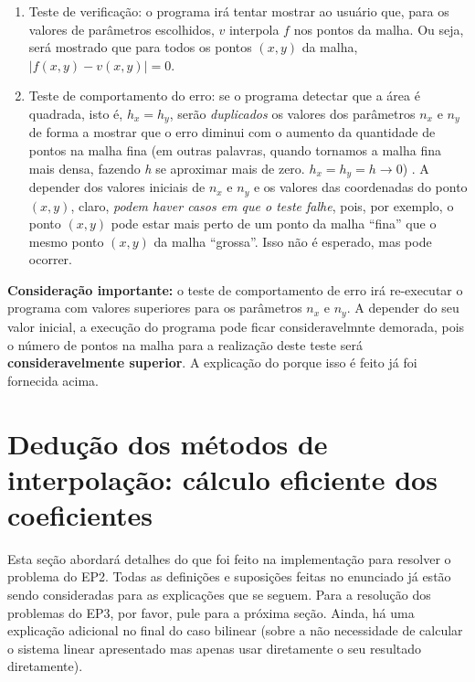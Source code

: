 \documentclass[11pt]{article}
\begin{document}
\begin{enumerate}
  \item Teste de verificação: o programa irá tentar mostrar ao usuário que, para os valores de parâmetros escolhidos, $v$ interpola $f$ nos pontos da malha. Ou seja, será mostrado
  que para todos os pontos $(x, y)$ da malha, $|f(x, y) - v(x, y)| = 0$.

  \item Teste de comportamento do erro: se o programa detectar que a área é quadrada, isto é, $h_x = h_y$, serão \textit{duplicados} os valores dos parâmetros $n_x$ e $n_y$ de forma a mostrar
  que o erro diminui com o aumento da quantidade de pontos na malha fina (em outras palavras, quando tornamos a malha fina mais densa, fazendo \textit{h} se aproximar mais de zero. $h_x = h_y = h \rightarrow 0$) .
  A depender dos valores iniciais de $n_x$ e $n_y$ e os valores das coordenadas do ponto $(x, y)$, claro, \textit{podem haver casos em que o teste falhe}, pois, por exemplo, o ponto $(x, y)$
  pode estar mais perto de um ponto da malha ``fina'' que o mesmo ponto $(x, y)$ da malha ``grossa''. Isso não é esperado, mas pode ocorrer.
\end{enumerate}

\textbf{Consideração importante:} o teste de comportamento de erro irá re-executar o programa com valores superiores para os parâmetros $n_x$ e $n_y$. A depender do seu valor inicial,
a execução do programa pode ficar consideravelmnte demorada, pois o número de pontos na malha para a realização deste teste será \textbf{consideravelmente superior}. A explicação do porque isso é feito
já foi fornecida acima.

\pagebreak

\section{Dedução dos métodos de interpolação: cálculo eficiente dos coeficientes}

\indent\indent Esta seção abordará detalhes do que foi feito na
implementação para resolver o problema do EP2. Todas as definições e suposições
feitas no enunciado já estão sendo consideradas para as explicações que se
seguem. Para a resolução dos problemas do EP3, por favor, pule para a próxima seção. Ainda, há
uma explicação adicional no final do caso bilinear (sobre a não necessidade de calcular o sistema linear
apresentado mas apenas usar diretamente o seu resultado diretamente).
\end{document}
